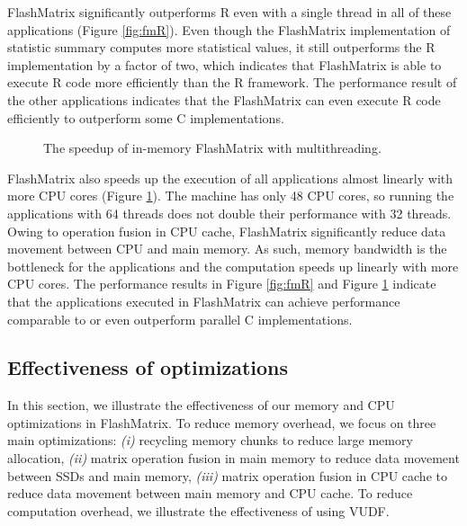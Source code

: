 FlashMatrix significantly outperforms R even with a single thread in all of these
applications (Figure \ref{fig:fmR}). Even though the FlashMatrix implementation
of statistic summary computes more statistical values, it still outperforms
the R implementation by a factor of two, which indicates that FlashMatrix is
able to execute R code more efficiently than the R framework. The performance
result of the other applications indicates that the FlashMatrix can even
execute R code efficiently to outperform some C implementations.

\begin{figure}
	\begin{center}
		\footnotesize
		
		\caption{The speedup of in-memory FlashMatrix with multithreading.}
		\label{fig:speedup}
	\end{center}
\end{figure}

FlashMatrix also speeds up the execution of all applications almost linearly
with more CPU cores (Figure \ref{fig:speedup}). The machine has only 48 CPU
cores, so running the applications with 64 threads does not double their
performance with 32 threads. Owing to operation fusion in CPU cache,
FlashMatrix significantly reduce data movement between CPU and main memory.
As such, memory bandwidth is the bottleneck for the applications and
the computation speeds up linearly with
more CPU cores. The performance results in Figure \ref{fig:fmR} and Figure
\ref{fig:speedup} indicate that the applications executed in FlashMatrix can
achieve performance comparable to or even outperform parallel C implementations.

\subsection{Effectiveness of optimizations}

In this section, we illustrate the effectiveness of our memory and CPU
optimizations in FlashMatrix. To reduce memory overhead, we focus on three
main optimizations: \textit{(i)} recycling memory chunks to reduce large
memory allocation, \textit{(ii)} matrix operation fusion in main
memory to reduce data movement between SSDs and main memory, \textit{(iii)}
matrix operation fusion in CPU cache to reduce data movement between main
memory and CPU cache. To reduce computation overhead, we illustrate
the effectiveness of using VUDF.

